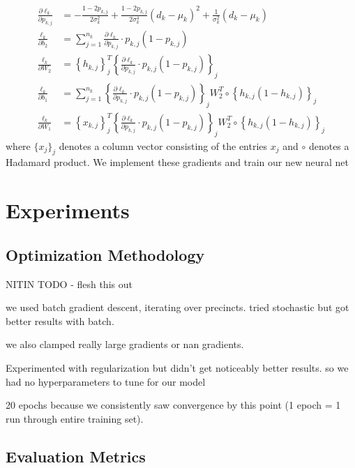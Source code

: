 \documentclass[10pt, letterpaper]{article}
\begin{document}
\begin{align*}
\frac{\partial \ell_k}{\partial p_{k, j}} &= - \frac{1 - 2p_{k, j}}{2 \sigma_k^2} + \frac{1 - 2p_{k, j}}{2 \sigma_k^4} (d_k - \mu_k)^2  + \frac{1}{\sigma_k^2} \left(d_k - \mu_k \right) \\
\frac{\ell_k}{\partial b_2} &= \sum_{j = 1}^{n_k} \frac{\partial \ell_k}{\partial p_{k, j}} \cdot p_{k, j} (1 - p_{k, j}) \\
\frac{\ell_k}{\partial W_2} &= \left\{ h_{k, j} \right\}_j^T \left\{ \frac{\partial \ell_k}{\partial p_{k, j}} \cdot p_{k, j} (1 - p_{k, j})\right\}_{j} \\
\frac{\ell_k}{\partial b_1} &= \sum_{j = 1}^{n_k} \left\{ \frac{\partial \ell_k}{\partial p_{k, j}} \cdot p_{k, j} (1 - p_{k, j})\right\}_{j} W_2^T \circ \left\{ h_{k, j}(1 - h_{k, j})\right\}_j \\
\frac{\ell_k}{\partial W_1} &= \left\{ x_{k, j} \right\}_j^T \left\{ \frac{\partial \ell_k}{\partial p_{k, j}} \cdot p_{k, j} (1 - p_{k, j})\right\}_{j} W_2^T \circ \left\{ h_{k, j}(1 - h_{k, j})\right\}_j
\end{align*}
where $\{x_j\}_j$ denotes a column vector consisting of the entries $x_j$ and $\circ$ denotes a Hadamard product. We implement these gradients and train our new neural net


\section{Experiments}

\subsection{Optimization Methodology}

NITIN TODO - flesh this out

we used batch gradient descent, iterating over precincts. tried stochastic but got better results with batch.

we also clamped really large gradients or nan gradients.

Experimented with regularization but didn't get noticeably better results. so we had no hyperparameters to tune for our model

20 epochs because we consistently saw convergence by this point (1 epoch = 1 run through entire training set).

\subsection{Evaluation Metrics}
\end{document}
